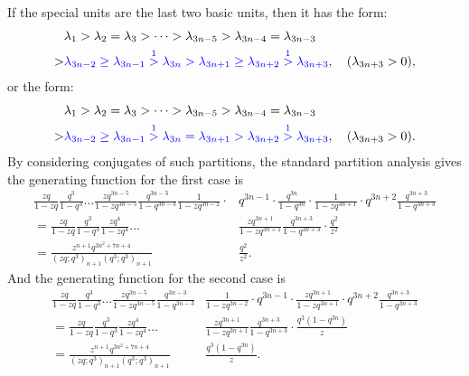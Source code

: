 \documentclass[draft]{amsart}
\numberwithin{equation}{section}
\theoremstyle{plain}
\theoremstyle{remark}
\begin{document}
If the special units are the last two basic units, then it has the form:
\begin{align*}
&\lambda_{1}>\lambda_{2}=\lambda_{3}>\dots>\lambda_{3n-5}>\lambda_{3n-4}=\lambda_{3n-3}\\
>&{\color{blue}\lambda_{3n-2}\geq\lambda_{3n-1}\overset{1}{>}\lambda_{3n}>\lambda_{3n+1}\geq \lambda_{3n+2}\overset{1}{>}\lambda_{3n+3}},\quad
 (\lambda_{3n+3}>0),
\end{align*} or the form:
\begin{align*}
&\lambda_{1}>\lambda_{2}=\lambda_{3}>\dots>\lambda_{3n-5}>\lambda_{3n-4}=\lambda_{3n-3}\\
>&{\color{blue}\lambda_{3n-2}\geq\lambda_{3n-1}\overset{1}{>}\lambda_{3n}=\lambda_{3n+1}> \lambda_{3n+2}\overset{1}{>}\lambda_{3n+3}},\quad
(\lambda_{3n+3}>0).
\end{align*}
By considering conjugates of such partitions, the standard partition analysis gives the generating function for the first case is
\begin{align}
 \frac{zq}{1-zq}\frac{q^{3}}{1-q^{3}}\dots\frac{zq^{3n-5}}{1-zq^{3n-5}}\frac{q^{3n-3}}{1-q^{3n-3}}
 \frac{1}{1-zq^{3n-2}}\cdot &q^{3n-1}\cdot\frac{q^{3n}}{1-q^{3n}}\cdot\frac{1}{1-zq^{3n+1}}\cdot q^{3n+2}\frac{q^{3n+3}}{1-q^{3n+3}}\nonumber\\
= \frac{zq}{1-zq}\frac{q^{3}}{1-q^{3}} \frac{zq^{4}}{1-zq^{4}}\dots&\frac{zq^{3n+1}}{1-zq^{3n+1}} \frac{q^{3n+3}}{1-q^{3n+3}}\cdot\frac{q^{2}}{z^{2}}\nonumber\\
=\frac{z^{n+1}q^{3n^{2}+7n+4}}{(zq;q^{3})_{n+1}(q^{3};q^{3})_{n+1}}&\frac{q^{2}}{z^{2}}.\label{3.7}
\end{align}
And the generating function for the second case is
\begin{align}
 \frac{zq}{1-zq}\frac{q^{3}}{1-q^{3}}\dots\frac{zq^{3n-5}}{1-zq^{3n-5}}\frac{q^{3n-3}}{1-q^{3n-3}}
 &\frac{1}{1-zq^{3n-2}}\cdot q^{3n-1}\cdot\frac{zq^{3n+1}}{1-zq^{3n+1}}\cdot q^{3n+2}\frac{q^{3n+3}}{1-q^{3n+3}}\nonumber\\
= \frac{zq}{1-zq}\frac{q^{3}}{1-q^{3}} \frac{zq^{4}}{1-zq^{4}}\dots&\frac{zq^{3n+1}}{1-zq^{3n+1}} \frac{q^{3n+3}}{1-q^{3n+3}}\cdot\frac{q^{3}(1-q^{3n})}{z}\nonumber\\
=\frac{z^{n+1}q^{3n^{2}+7n+4}}{(zq;q^{3})_{n+1}(q^{3};q^{3})_{n+1}}&\frac{q^{3}(1-q^{3n})}{z}.\label{3.8}
 \end{align}
 
\end{document}
